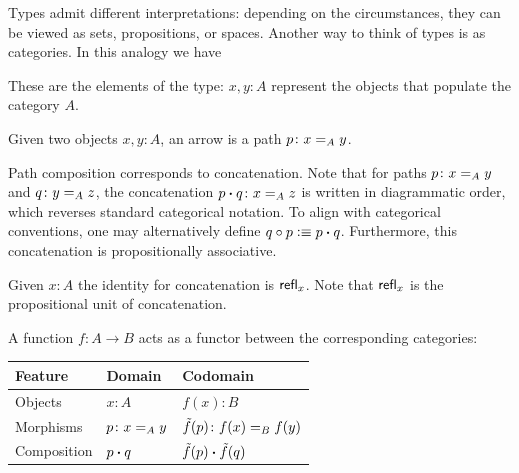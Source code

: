 \label{rem:types-as-categories}
Types admit different interpretations: depending on the circumstances, they can be viewed as sets, propositions, or spaces. Another way to think of types is as categories. In this analogy we have
\begin{description}[font=\normalfont\scshape]
    \item[Objects.] These are the elements of the type: $x,y\colon A$ represent the objects that populate the category $A$.

    \item[Arrows.] Given two objects $x,y\colon A$, an arrow is a path $p\colon x\eq Ay$.

    \item[Composition.] Path composition corresponds to concatenation. Note that for paths\/ $p\colon x\eq{A}y$ and\/ $q\colon y\eq{A}z$, the concatenation\/ $p\ct q\colon x\eq{A}z$ is written in diagrammatic order, which reverses standard categorical notation. To align with categorical conventions, one may alternatively define\/ $q\circ p\mathrel{\vcentcolon}\equiv p\mathbin{\boldsymbol{\cdot}} q$. Furthermore, this concatenation is propositionally associative.

    \item[Identity.] Given $x\colon A$ the identity for concatenation is $\mathsf{refl}_x$. Note that $\mathsf{refl}_x$ is the propositional unit of concatenation. 

    \item[Functors.] A function $f\colon A\to B$ acts as a functor between the corresponding categories:
    \begin{center}
        \begin{tabular}{lll}
            \small
            \textbf{Feature}
                &\textbf{Domain}
                &\textbf{Codomain}\\
            \hline\rule{0mm}{3.5mm}\small
            Objects
                &$x\colon A$
                &$f(x)\colon B$\\[0.7mm]
            \small
            Morphisms
                &$p\colon x\eq A y$
                &$\tilde f(p)\colon f(x)\eq Bf(y)$\\[0.7mm]
            \small
            Composition
                &$p\mathbin{\boldsymbol{\cdot}} q$
                &$\tilde f(p)\mathbin{\boldsymbol{\cdot}}\tilde f(q)$
        \end{tabular}
    \end{center}


\end{description}
